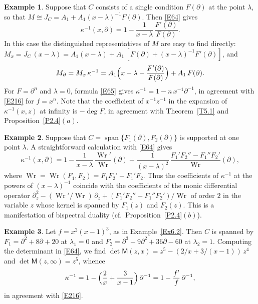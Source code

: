 \documentclass[11pt,reqno]{amsart}
\theoremstyle{plain}
\theoremstyle{definition}
\newtheorem{example}{Example}[section]
\theoremstyle{remark}
\numberwithin{equation}{section}
\newcommand{\del}{\partial}
\DeclareMathOperator{\Wr}{Wr}
\DeclareMathOperator{\spn}{span}
\begin{document}
\begin{example}
\label{Ex6.3}
Suppose that $C$ consists of a single condition $F(\del)$ at the point $\lambda$, so that
$M \cong J_C = A_1 + A_1 (x - \lambda)^{-1} F(\del)$. Then \eqref{E64} gives
\begin{equation}
\label{E65}
  \kappa^{-1}(x, \del) = 1 - \frac{1}{x - \lambda}\, \frac{F'(\del)}{F(\del)} .
\end{equation}
In this case the distinguished representatives of $M$ are easy to find directly: $M_x =
J_C\, (x - \lambda) = A_1 (x - \lambda) + A_1\,[F(\del) + (x-\lambda)^{-1} F'(\del)]$, and
\[
  M_\del = M_x\, \kappa^{-1} = A_1 \Bigl( x - \lambda - \frac{F'(\del)}{F(\del)} \Bigr) + A_1\,
  F(\del) .
\]
For $F = \del^n$ and $\lambda = 0$, formula \eqref{E65} gives $\kappa^{-1} = 1 - n\, x^{-1}
\del^{-1}$, in agreement with \eqref{E216} for $f = x^n$. Note that the coefficient of $x^{-1}
z^{-1}$ in the expansion of $\kappa^{-1}(x,z)$ at infinity is $- \deg F$, in agreement with
Theorem~\ref{T5.1} and Proposition~\ref{P2.4}$(a)$.
\end{example}

\begin{example}
\label{Ex6.4}
Suppose that $C = \spn\{F_1(\del), F_2(\del)\}$ is supported at one point $\lambda$. A
straightforward calculation with \eqref{E64} gives
\[
  \kappa^{-1}(x, \del) = 1 - \frac{1}{x - \lambda}\, \frac{\Wr'}{\Wr}(\del) + \frac{1}{(x -
  \lambda)^2}\, \frac{F_1' F_2'' - F_1'' F_2'}{\Wr}(\del) ,
\]
where $\Wr = \Wr(F_1, F_2) = F_1 F_2' - F_1' F_2$. Thus the coefficients of $\kappa^{-1}$ at the
powers of $(x - \lambda)^{-1}$ coincide with the coefficients of the monic differential operator
$\del_z^2 - (\Wr'/\Wr)\, \del_z + (F_1' F_2'' - F_1'' F_2')/\Wr$ of order $2$ in the variable $z$
whose kernel is spanned by $F_1(z)$ and $F_2(z)$. This is a manifestation of bispectral duality
(cf.\ Proposition~\ref{P2.4}$(b)$).
\end{example}

\begin{example}
\label{Ex6.5}
Let $f = x^2 (x-1)^3$, as in Example~\ref{Ex6.2}. Then $C$ is spanned by $F_1 = \del^2 + 8 \del +
20$ at $\lambda_1 = 0$ and $F_2 = \del^3 - 9 \del^2 + 36 \del - 60$ at $\lambda_2 = 1$. Computing
the determinant in \eqref{E64}, we find $\det \mathsf{M}(z,x) = z^5 - (2/x + 3/(x-1))\, z^4$ and
$\det \mathsf{M}(z, \infty) = z^5$, whence
\[
  \kappa^{-1} = 1 - \Bigl( \frac{2}{x} + \frac{3}{x-1} \Bigr)\, \del^{-1} = 1 - \frac{f'}{f}\,
  \del^{-1} ,
\]
in agreement with \eqref{E216}.
\end{example}
\end{document}
